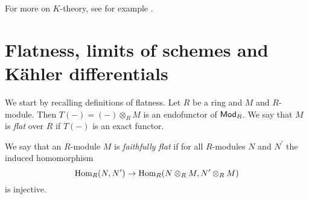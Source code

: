 \documentclass[11pt, english]{article}
\begin{document}
For more on $K$-theory, see for example \cite{rosenberg_ktheory}.


\pagebreak 
\section{Flatness, limits of schemes and Kähler differentials}

We start by recalling definitions of flatness. Let $R$ be a ring and $M$ and $R$-module. Then $T(-)=(-) \otimes_R M$ is an endofunctor of $\mathsf{Mod}_{R}$. We say that $M$ is \emph{flat} over $R$ if $T(-)$ is an exact functor.

\begin{defi}
We say that an $R$-module $M$ is \emph{faithfully flat} if for all $R$-modules $N$ and $N^\prime$ the induced homomorphism \[\operatorname{Hom}_R(N,N^\prime) \to \operatorname{Hom}_R(N \otimes_R M, N^\prime \otimes_R M)\]  is injective.
\end{defi}
\end{document}
